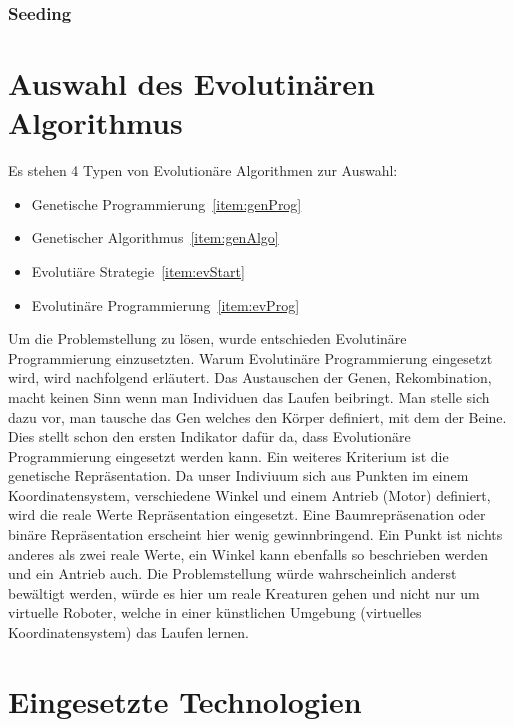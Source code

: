       \subsubsection{Seeding\label{subsub:GenotypeSeeding}}


  \section{Auswahl des Evolutinären Algorithmus}

    Es stehen 4 Typen von Evolutionäre Algorithmen zur Auswahl:
    \begin{itemize}
      \item Genetische Programmierung~\ref{item:genProg}
      \item Genetischer Algorithmus~\ref{item:genAlgo}
      \item Evolutiäre Strategie~\ref{item:evStart}
      \item Evolutinäre Programmierung~\ref{item:evProg}
    \end{itemize}
    Um die Problemstellung zu lösen, wurde entschieden Evolutinäre Programmierung einzusetzten.
    Warum Evolutinäre Programmierung eingesetzt wird, wird nachfolgend erläutert.
    Das Austauschen der Genen, Rekombination, macht keinen Sinn wenn man Individuen das Laufen beibringt.
    Man stelle sich dazu vor, man tausche das Gen welches den Körper definiert, mit dem der Beine.
    Dies stellt schon den ersten Indikator dafür da,
    dass Evolutionäre Programmierung eingesetzt werden kann. Ein weiteres Kriterium ist die genetische Repräsentation.
    Da unser Indiviuum sich aus Punkten im einem Koordinatensystem,
    verschiedene Winkel und einem Antrieb (Motor) definiert, wird die reale Werte Repräsentation eingesetzt.
    Eine Baumrepräsenation oder binäre Repräsentation erscheint hier wenig gewinnbringend.
    Ein Punkt ist nichts anderes als zwei reale Werte,
    ein Winkel kann ebenfalls so beschrieben werden und ein Antrieb auch.
    Die Problemstellung würde wahrscheinlich anderst bewältigt werden,
    würde es hier um reale Kreaturen gehen und nicht nur um virtuelle Roboter,
    welche in einer künstlichen Umgebung (virtuelles Koordinatensystem) das Laufen lernen.

  \section{Eingesetzte Technologien}


